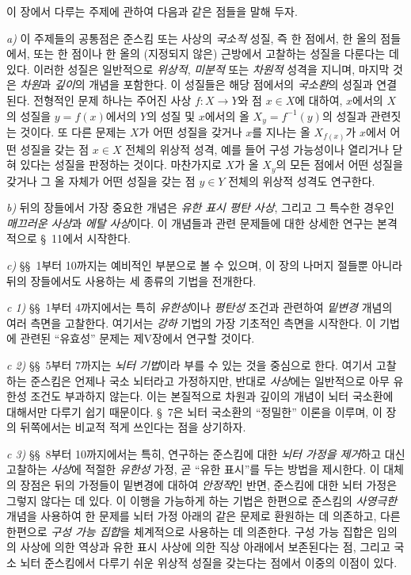 \clearpage
{}

이 장에서 다루는 주제에 관하여 다음과 같은 점들을 말해 두자.

\medskip
\noindent
\emph{a)} 이 주제들의 공통점은 준스킴 또는 사상의 \emph{국소적}
성질, 즉 한 점에서, 한 올의 점들에서, 또는 한 점이나 한 올의
(지정되지 않은) 근방에서 고찰하는 성질을 다룬다는 데 있다. 이러한
성질은 일반적으로 \emph{위상적}, \emph{미분적} 또는
\emph{차원적} 성격을 지니며, 마지막 것은 \emph{차원}과
\emph{깊이}의 개념을 포함한다. 이 성질들은 해당 점에서의
\emph{국소환}의 성질과 연결된다. 전형적인 문제 하나는 주어진 사상
$f:X\to Y$와 점 $x\in X$에 대하여, $x$에서의 $X$의 성질을
$y=f(x)$에서의 $Y$의 성질 및 $x$에서의 올
$X_y=f^{-1}(y)$의 성질과 관련짓는 것이다. 또 다른 문제는 $X$가
어떤 성질을 갖거나 $x$를 지나는 올 $X_{f(x)}$가 $x$에서 어떤
성질을 갖는 점 $x\in X$ 전체의 위상적 성격, 예를 들어 구성
가능성이나 열리거나 닫혀 있다는 성질을 판정하는 것이다. 마찬가지로
$X$가 올 $X_y$의 모든 점에서 어떤 성질을 갖거나 그 올 자체가 어떤
성질을 갖는 점 $y\in Y$ 전체의 위상적 성격도 연구한다.

\medskip
\noindent
\emph{b)} 뒤의 장들에서 가장 중요한 개념은 \emph{유한 표시 평탄
사상}, 그리고 그 특수한 경우인 \emph{매끄러운 사상}과
\emph{에탈 사상}이다. 이 개념들과 관련 문제들에 대한 상세한 연구는
본격적으로 §~11에서 시작한다.

\medskip
\noindent
\emph{c)} §§~1부터 10까지는 예비적인 부분으로 볼 수 있으며, 이
장의 나머지 절들뿐 아니라 뒤의 장들에서도 사용하는 세 종류의
기법을 전개한다.

\medskip
\noindent
\emph{c 1)} §§~1부터 4까지에서는 특히 \emph{유한성}이나
\emph{평탄성} 조건과 관련하여 \emph{밑변경} 개념의 여러 측면을
고찰한다. 여기서는 \emph{강하} 기법의 가장 기초적인 측면을
시작한다. 이 기법에 관련된 ``유효성'' 문제는 제V장에서 연구할
것이다.

\medskip
\noindent
\emph{c 2)} §§~5부터 7까지는 \emph{뇌터 기법}이라 부를 수 있는
것을 중심으로 한다. 여기서 고찰하는 준스킴은 언제나 국소 뇌터라고
가정하지만, 반대로 \emph{사상}에는 일반적으로 아무 유한성 조건도
부과하지 않는다. 이는 본질적으로 차원과 깊이의 개념이 뇌터
국소환에 대해서만 다루기 쉽기 때문이다. §~7은 뇌터 국소환의
``정밀한'' 이론을 이루며, 이 장의 뒤쪽에서는 비교적 적게 쓰인다는
점을 상기하자.

\medskip
\noindent
\emph{c 3)} §§~8부터 10까지에서는 특히, 연구하는 준스킴에 대한
\emph{뇌터 가정을 제거}하고 대신 고찰하는 \emph{사상}에 적절한
\emph{유한성} 가정, 곧 ``유한 표시''를 두는 방법을 제시한다. 이
대체의 장점은 뒤의 가정들이 밑변경에 대하여 \emph{안정적}인 반면,
준스킴에 대한 뇌터 가정은 그렇지 않다는 데 있다. 이 이행을 가능하게
하는 기법은 한편으로 준스킴의 \emph{사영극한} 개념을 사용하여 한
문제를 뇌터 가정 아래의 같은 문제로 환원하는 데 의존하고, 다른
한편으로 \emph{구성 가능 집합}을 체계적으로 사용하는 데 의존한다.
구성 가능 집합은 임의의 사상에 의한 역상과 유한 표시 사상에 의한
직상 아래에서 보존된다는 점, 그리고 국소 뇌터 준스킴에서 다루기
쉬운 위상적 성질을 갖는다는 점에서 이중의 이점이 있다.

